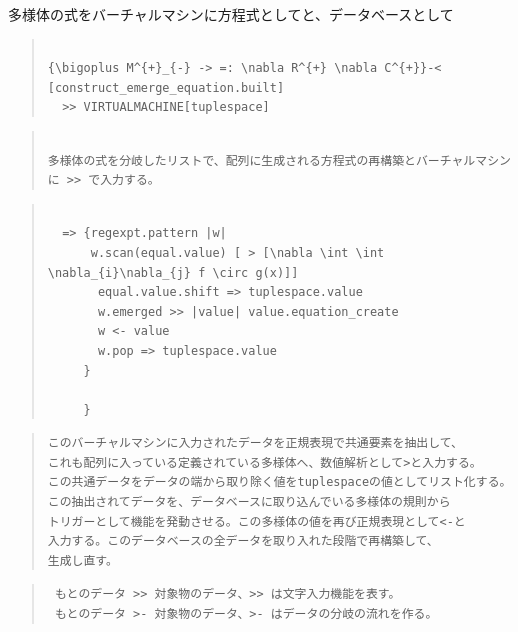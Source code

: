 \documentclass{jsarticle}
\begin{document}
多様体の式をバーチャルマシンに方程式としてと、データベースとして
\begin{quote}
\setlength{\baselineskip}{12pt}
\begin{verbatim}

{\bigoplus M^{+}_{-} -> =: \nabla R^{+} \nabla C^{+}}-< [construct_emerge_equation.built]
  >> VIRTUALMACHINE[tuplespace] 

\end{verbatim}
\end{quote}

\begin{quote}
\setlength{\baselineskip}{12pt}
\begin{verbatim}

多様体の式を分岐したリストで、配列に生成される方程式の再構築とバーチャルマシン
に >> で入力する。

\end{verbatim}
\end{quote}

\begin{quote}
\setlength{\baselineskip}{12pt}
\begin{verbatim}

  => {regexpt.pattern |w|
      w.scan(equal.value) [ > [\nabla \int \int \nabla_{i}\nabla_{j} f \circ g(x)]]
       equal.value.shift => tuplespace.value
       w.emerged >> |value| value.equation_create 
       w <- value
       w.pop => tuplespace.value
     }

     }
\end{verbatim}
\end{quote}

\begin{quote}
\setlength{\baselineskip}{12pt}
\begin{verbatim}
このバーチャルマシンに入力されたデータを正規表現で共通要素を抽出して、
これも配列に入っている定義されている多様体へ、数値解析として>と入力する。
この共通データをデータの端から取り除く値をtuplespaceの値としてリスト化する。
この抽出されてデータを、データベースに取り込んでいる多様体の規則から
トリガーとして機能を発動させる。この多様体の値を再び正規表現として<-と
入力する。このデータベースの全データを取り入れた段階で再構築して、
生成し直す。

\end{verbatim}
\end{quote}
\begin{quote}
\setlength{\baselineskip}{12pt}
\begin{verbatim}
 もとのデータ >> 対象物のデータ、>> は文字入力機能を表す。
 もとのデータ >- 対象物のデータ、>- はデータの分岐の流れを作る。
\end{verbatim}
\end{quote}
\end{document}
